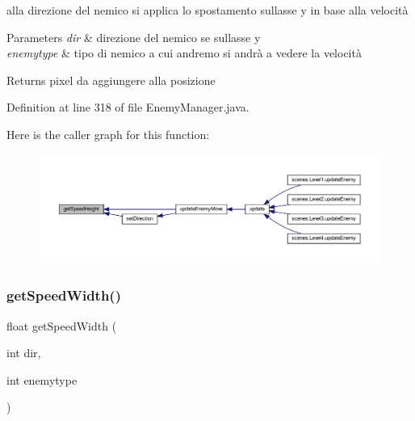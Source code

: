 alla direzione del nemico si applica lo spostamento sull\textquotesingle{}asse y in base alla velocità 


\begin{DoxyParams}{Parameters}
{\em dir} & direzione del nemico se sull\textquotesingle{}asse y \\
\hline
{\em enemytype} & tipo di nemico a cui andremo si andrà a vedere la velocità\\
\hline
\end{DoxyParams}
\begin{DoxyReturn}{Returns}
pixel da aggiungere alla posizione 
\end{DoxyReturn}


Definition at line 318 of file Enemy\+Manager.\+java.

Here is the caller graph for this function\+:\nopagebreak
\begin{figure}[H]
\begin{center}
\leavevmode
\includegraphics[width=350pt]{classmanagers_1_1_enemy_manager_a263c83da9aebeac50b60770fb847f331_icgraph}
\end{center}
\end{figure}
\mbox{\label{classmanagers_1_1_enemy_manager_ae622455c9dd19d2583b9a8840b1b35de}} 
\subsubsection{\texorpdfstring{get\+Speed\+Width()}{getSpeedWidth()}}
{\footnotesize\ttfamily float get\+Speed\+Width (\begin{DoxyParamCaption}\item[{int}]{dir,  }\item[{int}]{enemytype }\end{DoxyParamCaption})}



